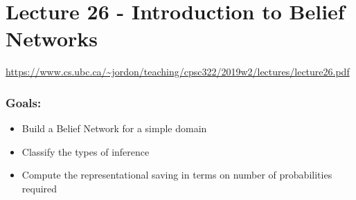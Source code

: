 \documentclass{article}
\begin{document}
\section*{Lecture 26 - Introduction to Belief Networks}
\url{https://www.cs.ubc.ca/~jordon/teaching/cpsc322/2019w2/lectures/lecture26.pdf}
\subsubsection*{Goals:}
\begin{itemize}
	\item Build a Belief Network for a simple domain
	\item Classify the types of inference
	\item Compute the representational saving in terms on number of probabilities required
\end{itemize}
\end{document}
